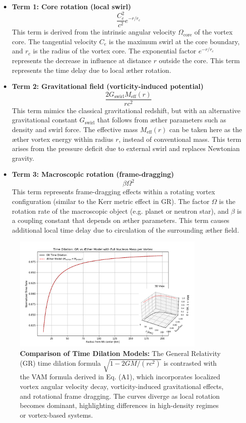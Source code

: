 \begin{itemize}
  \item \textbf{Term 1: Core rotation (local swirl)}
  \[
    \frac{C_e^2}{c^2} e^{-r/r_c}
  \]
  This term is derived from the intrinsic angular velocity $\Omega_\text{core}$ of the vortex core. The tangential velocity $C_e$ is the maximum swirl at the core boundary, and $r_c$ is the radius of the vortex core. The exponential factor $e^{-r/r_c}$ represents the decrease in influence at distance $r$ outside the core. This term represents the time delay due to local æther rotation.

  \item \textbf{Term 2: Gravitational field (vorticity-induced potential)}
  \[
    \frac{2 G_\text{swirl} M_\text{eff}(r)}{r c^2}
  \]
  This term mimics the classical gravitational redshift, but with an alternative gravitational constant $G_\text{swirl}$ that follows from æther parameters such as density and swirl force. The effective mass $M_\text{eff}(r)$ can be taken here as the æther vortex energy within radius $r$, instead of conventional mass. This term arises from the pressure deficit due to external swirl and replaces Newtonian gravity.

  \item \textbf{Term 3: Macroscopic rotation (frame-dragging)}
  \[
    \beta \Omega^2
  \]
  This term represents frame-dragging effects within a rotating vortex configuration (similar to the Kerr metric effect in GR). The factor $\Omega$ is the rotation rate of the macroscopic object (e.g. planet or neutron star), and $\beta$ is a coupling constant that depends on æther parameters. This term causes additional local time delay due to circulation of the surrounding æther field.

\end{itemize}

\begin{figure}[H]
  \centering
  \includegraphics[width=0.85\textwidth]{images/07-TimeDilationGRVsVAM}
  \caption{
  \textbf{Comparison of Time Dilation Models:} The General Relativity (GR) time dilation formula \(\sqrt{1 - 2GM/(rc^2)}\) is contrasted with the VAM formula derived in Eq. (A1), which incorporates localized vortex angular velocity decay, vorticity-induced gravitational effects, and rotational frame dragging. The curves diverge as local rotation becomes dominant, highlighting differences in high-density regimes or vortex-based systems.
  }
  \label{fig:GRvsVAMTimeDilation}
\end{figure}



